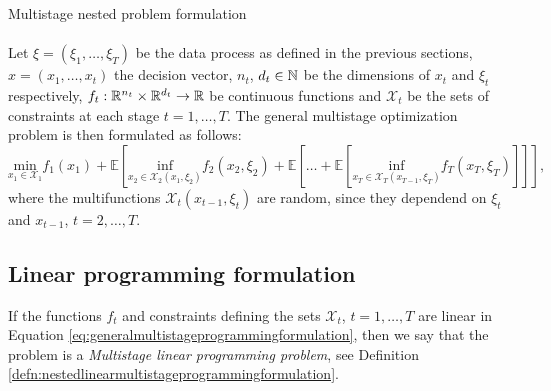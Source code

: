 \begin{defn}{Multistage nested problem formulation} \label{defn:generalmultistageprogrammingformulation}
\\ 
\cite[Section 3.1.1.]{stochasticprogrammingbible2009}
 \\
Let $\xi=(\xi_1,\dots,\xi_{T})$ be the data process as defined in the previous sections, \\ $x=(x_1,\dots,x_t)$ the decision vector, $n_t$, $d_t \in \mathbb{N}$ be the dimensions of $x_t$ and $\xi_t$ respectively, $f_t: \mathbb{R}^{n_t} \times \mathbb{R}^{d_t} \rightarrow \mathbb{R}$ be continuous functions and $
\mathcal{X}_t$ be the sets of constraints at each stage $t=1,\dots,T$. The general multistage optimization problem is then formulated as follows:
\footnotesize
\begin{equation}
\label{eq:generalmultistageprogrammingformulation}
\underset{x_1 \in \mathcal{X}_1}{\mathrm{min}}
 f_1(x_1) + \mathbb{E}\left[ \underset{x_2 \in \mathcal{X}_2(x_1, \xi_2)}{\mathrm{inf}} f_2(x_2,\xi_2) + \mathbb{E}\left[\dots + \mathbb{E}\left[ \underset{x_T \in \mathcal{X}_T(x_{T-1}, \xi_T)}{\mathrm{inf}} f_T(x_T,\xi_T)\right] \right] \right],
\end{equation}
\normalsize
where the multifunctions $\mathcal{X}_t(x_{t-1},\xi_t)$ are random, since they dependend on $\xi_t$ and $x_{t-1}$, $t=2,\dots,T$.
\end{defn}


\newpage
\subsection{Linear programming formulation}
If the functions $f_t$ and constraints defining the sets $\mathcal{X}_t$, $t=1,\dots,T$ are linear in Equation \ref{eq:generalmultistageprogrammingformulation}, then we say that the problem is a \textit{Multistage linear programming problem}, see Definition \ref{defn:nestedlinearmultistageprogrammingformulation}.

